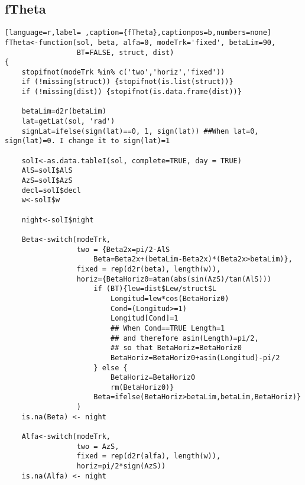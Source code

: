 \subsection{fTheta}
\label{sec:org2c6d9e6}
\label{subsec:ftheta}
\begin{lstlisting}[language=r,label= ,caption={fTheta},captionpos=b,numbers=none]
fTheta<-function(sol, beta, alfa=0, modeTrk='fixed', betaLim=90, 
                 BT=FALSE, struct, dist)
{
    stopifnot(modeTrk %in% c('two','horiz','fixed'))
    if (!missing(struct)) {stopifnot(is.list(struct))}
    if (!missing(dist)) {stopifnot(is.data.frame(dist))}

    betaLim=d2r(betaLim)
    lat=getLat(sol, 'rad')
    signLat=ifelse(sign(lat)==0, 1, sign(lat)) ##When lat=0, sign(lat)=0. I change it to sign(lat)=1

    solI<-as.data.tableI(sol, complete=TRUE, day = TRUE)
    AlS=solI$AlS
    AzS=solI$AzS
    decl=solI$decl
    w<-solI$w

    night<-solI$night

    Beta<-switch(modeTrk,
                 two = {Beta2x=pi/2-AlS	
                     Beta=Beta2x+(betaLim-Beta2x)*(Beta2x>betaLim)},
                 fixed = rep(d2r(beta), length(w)), 
                 horiz={BetaHoriz0=atan(abs(sin(AzS)/tan(AlS)))
                     if (BT){lew=dist$Lew/struct$L
                         Longitud=lew*cos(BetaHoriz0)
                         Cond=(Longitud>=1)
                         Longitud[Cond]=1
                         ## When Cond==TRUE Length=1
                         ## and therefore asin(Length)=pi/2,
                         ## so that BetaHoriz=BetaHoriz0
                         BetaHoriz=BetaHoriz0+asin(Longitud)-pi/2                                     
                     } else {
                         BetaHoriz=BetaHoriz0
                         rm(BetaHoriz0)}
                     Beta=ifelse(BetaHoriz>betaLim,betaLim,BetaHoriz)}
                 )
    is.na(Beta) <- night

    Alfa<-switch(modeTrk,
                 two = AzS,
                 fixed = rep(d2r(alfa), length(w)),
                 horiz=pi/2*sign(AzS))
    is.na(Alfa) <- night


\end{lstlisting}
